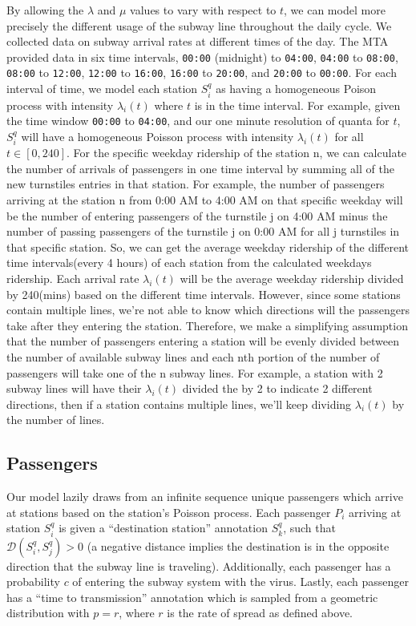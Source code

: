\documentclass[12pt]{article}
\begin{document}
By allowing the $\lambda$ and $\mu$ values to vary with respect to $t$, we can model more precisely the different usage of the subway line throughout the daily cycle. 
We collected data on subway arrival rates at different times of the day.
The MTA provided data\cite{arrival_rate} in six time intervals, \texttt{00:00} (midnight) to \texttt{04:00}, \texttt{04:00} to \texttt{08:00}, \texttt{08:00} to \texttt{12:00}, \texttt{12:00} to \texttt{16:00}, \texttt{16:00} to \texttt{20:00}, and \texttt{20:00} to \texttt{00:00}.
For each interval of time, we model each station $S_i^q$ as having a homogeneous Poison process with intensity $\lambda_i(t)$ where $t$ is in the time interval.
For example, given the time window \texttt{00:00} to \texttt{04:00}, and our one minute resolution of quanta for $t$, $S_i^q$ will have a homogeneous Poisson process with intensity $\lambda_i(t)$ for all $t \in [0, 240]$.
For the specific weekday ridership of the station n, we can calculate the number of arrivals of passengers in one time interval by summing all of the new turnstiles entries in that station. For example, the number of passengers arriving at the station n from 0:00 AM to 4:00 AM on that specific weekday will be the number of entering passengers of the turnstile j on 4:00 AM minus the number of passing passengers of the turnstile j on 0:00 AM for all j turnstiles in that specific station. So, we can get the average weekday ridership of the different time intervals(every 4 hours) of each station from the calculated weekdays ridership. Each arrival rate $\lambda_i(t)$ will be the average weekday ridership divided by 240(mins) based on the different time intervals. However, since some stations contain multiple lines, we're not able to know which directions will the passengers take after they entering the station. Therefore, we make a simplifying assumption that the number of passengers entering a station will be evenly divided between the number of available subway lines and each nth portion of the number of passengers will take one of the n subway lines. For example, a station with 2 subway lines will have their $\lambda_i(t)$  divided the by 2 to indicate 2 different directions, then if a station contains multiple lines, we'll keep dividing $\lambda_i(t)$ by the number of lines.

\subsection{Passengers}

Our model lazily draws from an infinite sequence unique passengers which arrive at stations based on the station's Poisson process. Each passenger $P_i$ arriving at station $S_i^q$ is given a ``destination station'' annotation  $S_k^q$, such that $\mathcal{D}(S_i^q, S_j^q) > 0$ (a negative distance implies the destination is in the opposite direction that the subway line is traveling).
Additionally, each passenger has a probability $c$ of entering the subway system with the virus. Lastly, each passenger has a ``time to transmission'' annotation which is sampled from a geometric distribution with $p=r$, where $r$ is the rate of spread as defined above.
\end{document}
